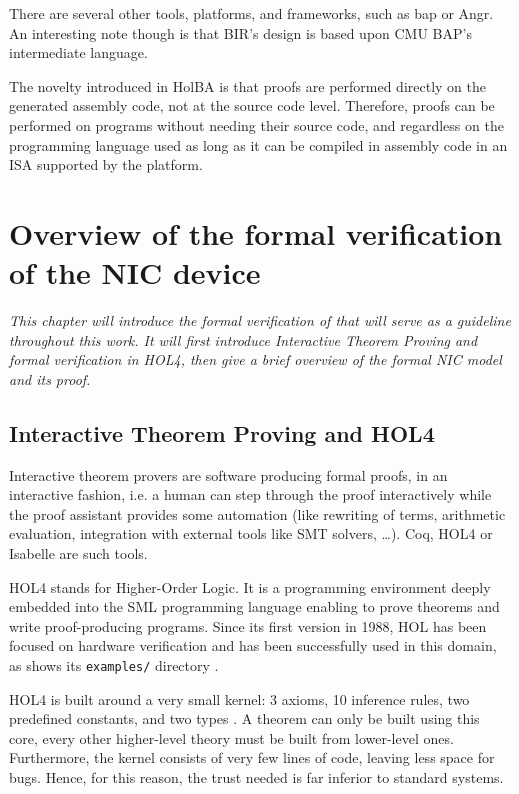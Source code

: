 \documentclass{kththesis}
\begin{document}
There are several other tools, platforms, and frameworks, such as \gls{bap} \cite{noauthor_binary_2019} or Angr. An interesting note though is that BIR's design is based upon CMU BAP's intermediate language.

The novelty introduced in HolBA is that proofs are performed directly on the generated assembly code, not at the source code level. Therefore, proofs can be performed on programs without needing their source code, and regardless on the programming language used as long as it can be compiled in assembly code in an \gls{ISA} supported by the platform.


\chapter{Overview of the formal verification of the NIC device} \label{chapter-overview-nic}
\vspace{-1cm}
\textit{This chapter will introduce the formal verification of \cite{haglund_formal_2016} that will serve as a guideline throughout this work. It will first introduce Interactive Theorem Proving and formal verification in HOL4, then give a brief overview of the formal NIC model and its proof.}

\section{Interactive Theorem Proving and HOL4} \label{hol4-presentation}

Interactive theorem provers are software producing formal proofs, in an
interactive fashion, i.e. a human can step through the proof interactively while the proof assistant provides some automation (like rewriting of terms, arithmetic evaluation, integration with external tools like SMT solvers, \dots). Coq, HOL4 or Isabelle are such tools.

HOL4 \cite{noauthor_hol_nodate} stands for Higher-Order Logic. It is a programming environment deeply embedded into the \gls{SML} programming language enabling to prove theorems and write \gls{proof-producing} programs. Since its first version in 1988, HOL has been focused on hardware verification and has been successfully used in this domain, as shows its \texttt{examples/} directory \cite{noauthor_canonical_2019}.

HOL4 is built around a very small kernel: 3 axioms, 10 inference rules, two predefined constants, and two types \cite{tuerk_interactive_nodate} \footnotemark. A theorem can only be built using this core, every other higher-level theory must be built from lower-level ones. Furthermore, the kernel consists of very few lines of code, leaving less space for bugs. Hence, for this reason, the trust needed is far inferior to standard systems.
\end{document}
